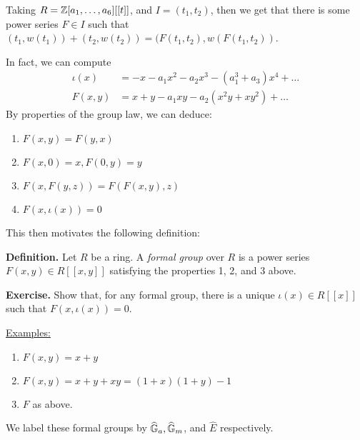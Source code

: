 \documentclass[10pt,a4paper]{article}
\begin{document}
Taking $R = \mathbb{Z}[a_1, \ldots, a_6][[t]]$, and $I=(t_1, t_2)$, then we get that there is some power series $F \in I$ such that $(t_1,w(t_1))+(t_2,w(t_2)) = (F(t_1,t_2),w(F(t_1,t_2))$.

In fact, we can compute
\begin{align*}
  \iota(x) &= -x-a_1x^2-a_2x^3-(a_1^3+a_3)x^4+\ldots\\
  F(x, y) &= x+y-a_1xy-a_2(x^2y+xy^2)+\ldots
\end{align*}
By properties of the group law, we can deduce:
\begin{enumerate}
  \item $F(x, y) = F(y, x)$
  \item $F(x, 0) = x, F(0, y) = y$
  \item $F(x, F(y, z)) = F(F(x, y), z)$
  \item $F(x, \iota(x)) = 0$
\end{enumerate}
This then motivates the following definition:

\textbf{Definition.} Let $R$ be a ring. A \emph{formal group} over $R$ is a power series $F(x, y) \in R[[x, y]]$ satisfying the properties 1, 2, and 3 above.

\textbf{Exercise.} Show that, for any formal group, there is a unique $\iota(x) \in R[[x]]$ such that \mbox{$F(x,\iota(x)) = 0$}.

\underline{Examples:}
\begin{enumerate}
  \item $F(x, y) = x + y$
  \item $F(x, y) = x + y + x y = (1 + x)(1 + y) - 1$
  \item $F$ as above.
\end{enumerate}
We label these formal groups by $\widehat{\mathbb{G}}_a, \widehat{\mathbb{G}}_m$, and $\hat{E}$ respectively.
\end{document}
